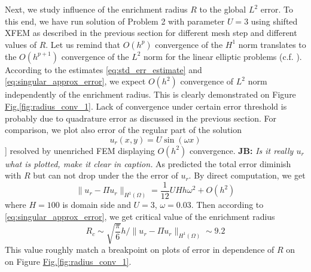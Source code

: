 \documentclass{elsarticle}
\newcommand{\fig}[1]{\hyperref[#1]{Fig.\ref{#1}}}
\def\norm#1{\| #1 \|}
\newcommand{\noteJB}[1]{{\color{Blue} \textbf{JB: } \textit{#1}}}
\begin{document}
Next, we study influence of the enrichment radius $R$ to the global $L^2$ error. To this end, we have run solution of Problem 2 with parameter $U=3$
using shifted XFEM as described in the previous section for different mesh step and different values of $R$.
Let us remind that $O(h^p)$ convergence of the $H^1$ norm translates to the $O(h^{p+1})$ convergence of the $L^2$ norm 
for the linear elliptic problems (c.f. \cite[Theorem 19.2]{ciarlet_basic_1991}). According to the estimates \eqref{eq:std_err_estimate}
and \eqref{eq:singular_approx_error}, we expect $O(h^2)$ convergence of $L^2$ norm independently of the enrichment radius. This is 
clearly demonstrated on Figure \fig{fig:radius_conv_1}. Lack of convergence under certain error threshold is probably due to 
quadrature error as discussed in the previous section. For comparison, we plot also error of the regular part of the solution
\[
  u_r(x,y) = U \sin (\omega x)
\]
]
resolved by unenriched FEM displaying $O(h^2)$ convergence. \noteJB{Is it really $u_r$ what is plotted, make it clear in caption.}
As predicted the total error diminish with $R$ but can not 
drop under the the error of $u_r$. By direct computation, we get
\[
  \norm{u_r - \Pi u_r}_{H^1(\Omega)} = \frac{1}{12}UHh\omega^2 + O(h^2)
\]
where $H=100$ is domain side and $U=3$, $\omega=0.03$. Then according to \eqref{eq:singular_approx_error},
we get critical value of the enrichment radius
\[
    R_c \sim \sqrt{\frac{\pi}{6}} h/\norm{u_r - \Pi u_r}_{H^1(\Omega)} \sim 9.2
\]
This value roughly match a breakpoint on plots of error in dependence of $R$ on 
on Figure \fig{fig:radius_conv_1}.
\end{document}
